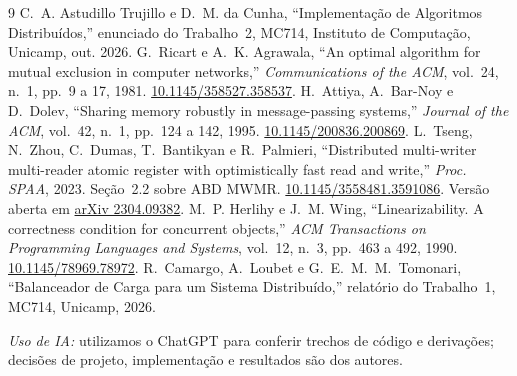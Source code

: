 \documentclass[conference]{IEEEtran}
\begin{document}
\begin{thebibliography}{9}
C.~A. Astudillo Trujillo e D.~M. da Cunha, ``Implementação de Algoritmos Distribuídos,'' enunciado do Trabalho~2, MC714, Instituto de Computação, Unicamp, out. 2026.
G.~Ricart e A.~K. Agrawala, ``An optimal algorithm for mutual exclusion in computer networks,'' \emph{Communications of the ACM}, vol.~24, n.~1, pp.~9 a 17, 1981. \href{https://doi.org/10.1145/358527.358537}{10.1145/358527.358537}.
H.~Attiya, A.~Bar-Noy e D.~Dolev, ``Sharing memory robustly in message-passing systems,'' \emph{Journal of the ACM}, vol.~42, n.~1, pp.~124 a 142, 1995. \href{https://doi.org/10.1145/200836.200869}{10.1145/200836.200869}.
L.~Tseng, N.~Zhou, C.~Dumas, T.~Bantikyan e R.~Palmieri, ``Distributed multi-writer multi-reader atomic register with optimistically fast read and write,'' \emph{Proc. SPAA}, 2023. Seção~2.2 sobre ABD MWMR. \href{https://doi.org/10.1145/3558481.3591086}{10.1145/3558481.3591086}. Versão aberta em \href{https://arxiv.org/abs/2304.09382}{arXiv 2304.09382}.
M.~P. Herlihy e J.~M. Wing, ``Linearizability. A correctness condition for concurrent objects,'' \emph{ACM Transactions on Programming Languages and Systems}, vol.~12, n.~3, pp.~463 a 492, 1990. \href{https://doi.org/10.1145/78969.78972}{10.1145/78969.78972}.
R.~Camargo, A.~Loubet e G.~E.~M.~M.~Tomonari, ``Balanceador de Carga para um Sistema Distribuído,'' relatório do Trabalho~1, MC714, Unicamp, 2026.
\end{thebibliography}

\textit{Uso de IA:} utilizamos o ChatGPT para conferir trechos de código e derivações; decisões de projeto, implementação e resultados são dos autores.
\end{document}
